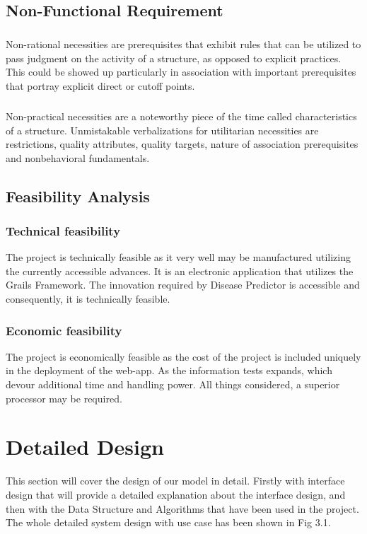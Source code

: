 \documentclass[oneside,12pt]{Classes/VTU}
\begin{document}
    	
    	\section{Non-Functional Requirement}
    	\paragraph{}
    	Non-rational necessities are prerequisites that exhibit rules that can be utilized to pass judgment on the activity of a structure, as opposed to explicit practices. This could be showed up particularly in association with important prerequisites that portray explicit direct or cutoff points. 
    	\paragraph{} 
    	Non-practical necessities are a noteworthy piece of the time called characteristics of a structure. Unmistakable verbalizations for utilitarian necessities are restrictions, quality attributes, quality targets, nature of association prerequisites and nonbehavioral fundamentals.
    	
    	\section{Feasibility Analysis}
    	\subsection{Technical feasibility} 
    	The project is technically feasible as it very well may be manufactured utilizing the currently accessible advances. It is an electronic application that utilizes the Grails Framework. The innovation required by Disease Predictor is accessible and consequently, it is technically feasible.
    	
    	\subsection{Economic feasibility} 
    	The project is economically feasible as the cost of the project is included uniquely in the deployment of the web-app. As the information tests expands, which devour additional time and handling power. All things considered, a superior processor may be required.
    	
    	\chapter{Detailed Design}
    	This section will cover the design of our model in detail. Firstly with interface design that will provide a detailed explanation about the interface design, and then with the Data Structure and Algorithms that have been used in the project. The whole detailed system design with use case has been shown in Fig 3.1.
    	
\end{document}
